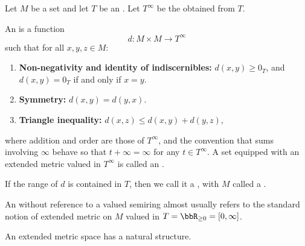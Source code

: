 \begin{definition} \label{definition:extended_metric_on_a_set_valued_in_an_ordered_semiring_with_adjoined_infinity}
    Let $M$ be a set and let $T$ be an . Let $T^\infty$ be the  obtained from $T$.

    An  is a function
    $$d : M \times M \to T^\infty$$
    such that for all $x,y,z \in M$:
    \begin{enumerate}
        \item \textbf{Non-negativity and identity of indiscernibles:} \quad $d(x,y) \geq 0_T$, and $d(x,y) = 0_T$ if and only if $x = y$.
        \item \textbf{Symmetry:} \quad $d(x,y) = d(y,x)$.
        \item \textbf{Triangle inequality:} \quad $d(x,z) \leq d(x,y) + d(y,z)$,
    \end{enumerate}
    where addition and order are those of $T^\infty$, and the convention that sums involving $\infty$ behave so that $t + \infty = \infty$ for any $t \in T^\infty$. A set equipped with an extended metric valued in $T^\infty$ is called an .

    If the range of $d$ is contained in $T$, then we call it a , with $M$ called a .

    An  without reference to a valued semiring almost usually refers to the standard notion of extended metric on $M$ valued in $T = \bbR_{\geq 0} = [0,\infty]$. 

    An extended metric space has a natural  structure.
\end{definition}
